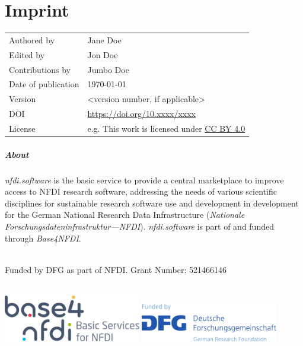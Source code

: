 \documentclass[headsepline,titlepage,twoside,12pt,toc=flat,headings=normal]{scrreprt}
\author{\theauthor}
\date{\thedate}
\title{\thetitle}
\subtitle{Subtitle (optional)}
\newcommand{\thedate}{\today}
\newcommand{\theauthor}{Jane Doe}
\newcommand{\theeditor}{Jon Doe}
\newcommand{\thecontributor}{Jumbo Doe}
\begin{document}
\maketitle

\chapter*{Imprint}\label{ch:imprint}

\begin{tabular}{ll}
Authored by			&\theauthor\\
Edited by			&\theeditor\\
Contributions by	&\thecontributor\\
Date of publication	&\thedate\\
Version				&<version number, if applicable>\\
DOI					&\url{https://doi.org/10.xxxx/xxxx}\\
License				&e.g. This work is licensed under \href{https://creativecommons.org/licenses/by/4.0/}{CC BY 4.0}\\
\end{tabular}

\paragraph{About}
\emph{nfdi.software} is the basic service to provide a central marketplace to improve access to NFDI research software,
addressing the needs of various scientific disciplines for sustainable research software use and development in development for the German National Research Data Infrastructure (\emph{Nationale Forschungsdateninfrastruktur---NFDI}).
\emph{nfdi.software} is part of and funded through \emph{Base4NFDI}.

~\\
Funded by DFG as part of NFDI. Grant Number: 521466146

~\\
\includegraphics[width=6cm]{img/base.png}
\hfill
\includegraphics[width=6cm]{img/dfg.pdf}
\end{document}
